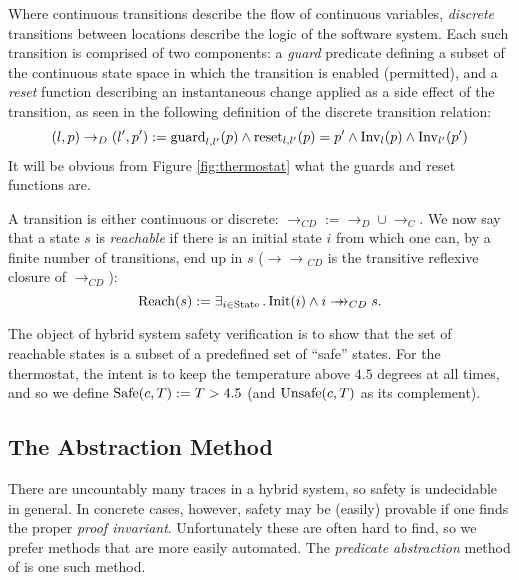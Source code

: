\documentclass[runningheads]{llncs}
\newcommand{\Exists}[2]{\exists_{#1} \, . \, #2}
\newcommand{\weg}[1]{}
\newcommand{\State}{{\rm State}}
\newcommand{\Inv}{{\rm Inv}}
\newcommand{\Init}{{\rm Init}}
\newcommand{\Unsafe}{{\rm Unsafe}}
\newcommand{\Safe}{{\rm Safe}}
\newcommand{\Reach}{{\rm Reach}}
\newcommand{\guard}{{\rm guard}}
\newcommand{\reset}{{\rm reset}}
\newcommand{\trans}{\rightarrow_{CD}}
\newcommand{\doubleheadrightarrow}{\mathrel{\rightarrow\!\!\!\!\rightarrow}}
\newcommand{\ttrans}{\doubleheadrightarrow_{CD}}
\newcommand{\contrans}{\rightarrow_C}
\newcommand{\distrans}{\rightarrow_D}
\begin{document}
Where continuous transitions describe the flow of continuous
variables, \emph{discrete} transitions between locations describe the
logic of the software system. Each such transition is comprised of two
components: a \emph{guard} predicate defining a subset of the continuous state
space in which the transition is enabled (permitted), and a \emph{reset} function
describing an
instantaneous change applied as a side effect of the transition, as
seen in the following definition of the discrete transition relation:
$$ (l,p) \distrans (l',p') := \guard_{l,l'}(p) \wedge \reset_{l,l'}(p)= p' \wedge \Inv_l(p) \wedge \Inv_{l'}(p')$$
It will be obvious from Figure \ref{fig:thermostat} what the guards
and reset functions are.

\weg{
The reset function resets the clock for all
but one of these transitions, and leaves the temperature variable as
is. Here we can discern a conceptual distinction between continuous
variables directly controlled by the system (such as the clock in the
thermostat), and variables that model a physical phenomenon and that
can only be observed (such as the temperature in the thermostat). This
distinction is not made explicit in the definition of a hybrid system;
in principle, nothing is stopping the thermostat from treating
temperature as a variable of the former kind and resetting its
value. However, this would simply make the system unimplementable.
}

A transition is either continuous or discrete: $\trans:= \distrans \cup \contrans$. We now say that a state $s$ is \emph{reachable} if there is an initial state $i$ from which one can, by a finite number of transitions, end up in $s$ ($\ttrans$ is the transitive reflexive closure of $\trans$):
$$\Reach(s):=
    \Exists{i\in \State}{\Init(i) \wedge i \ttrans s}.$$
\weg{As mentioned before, the set of reachable states represents the
possible behaviours exhibited by a hypothetical real-world
implementation of the hybrid system (as software running on a device
with sensors and actuators).
}

The object of hybrid system safety verification is to show that the set of reachable states is a subset of a predefined set of ``safe'' states. For the thermostat, the intent is to
keep the temperature above $4.5$ degrees at all times, and so we define $\Safe(c,T) := T > 4.5$ (and $\Unsafe(c,T)$ as its complement).

\subsection{The Abstraction Method}
There are uncountably many traces in a hybrid system, so safety is
undecidable in general. In concrete cases, however, safety may be (easily)
provable if one finds the proper {\em proof invariant}. Unfortunately these
are often hard to find, so we prefer methods that are more easily automated. The \emph{predicate abstraction} method of \cite{alur} is one such method.
\end{document}
